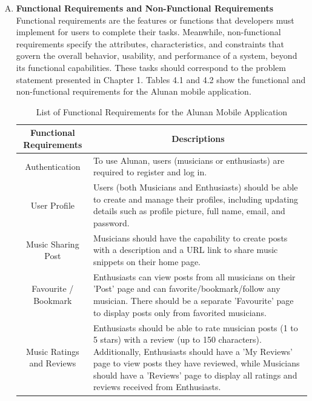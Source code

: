 \begin{enumerate}[A.]
    \item \textbf{Functional Requirements and Non-Functional Requirements} \\ Functional requirements are the features or functions that developers must implement for users to complete their tasks. Meanwhile, non-functional requirements specify the attributes, characteristics, and constraints that govern the overall behavior, usability, and performance of a system, beyond its functional capabilities. These tasks should correspond to the problem statement presented in Chapter 1. Tables 4.1 and 4.2 show the functional and non-functional requirements for the Alunan mobile application. \\
    
    \begin{table}[htb]
        \caption{\centering List of Functional Requirements for the Alunan Mobile Application}
        \label{tab:mytable}
        \centering
        \begin{tabular}{|p{7.5cm}|p{9.5cm}|}
        \hline
        \multicolumn{1}{|c|}{\textbf{Functional Requirements}} & 
        \multicolumn{1}{c|}{\textbf{Descriptions}} \\
        \hline 
        \multicolumn{1}{|c|}{Authentication} & To use Alunan, users (musicians or enthusiasts) are required to register and log in. \\ \hline
        \multicolumn{1}{|c|}{User Profile} & Users (both Musicians and Enthusiasts) should be able to create and manage their profiles, including updating details such as profile picture, full name, email, and password. \\ \hline
        \multicolumn{1}{|c|}{Music Sharing Post} & Musicians should have the capability to create posts with a description and a URL link to share music snippets on their home page. \\ \hline
        \multicolumn{1}{|c|}{Favourite / Bookmark} & Enthusiasts can view posts from all musicians on their 'Post' page and can favorite/bookmark/follow any musician. There should be a separate 'Favourite' page to display posts only from favorited musicians. \\ \hline
        \multicolumn{1}{|c|}{Music Ratings and Reviews} & Enthusiasts should be able to rate musician posts (1 to 5 stars) with a review (up to 150 characters). Additionally, Enthusiasts should have a 'My Reviews' page to view posts they have reviewed, while Musicians should have a 'Reviews' page to display all ratings and reviews received from Enthusiasts. \\ \hline
        \end{tabular}
    \end{table}


\end{enumerate}

